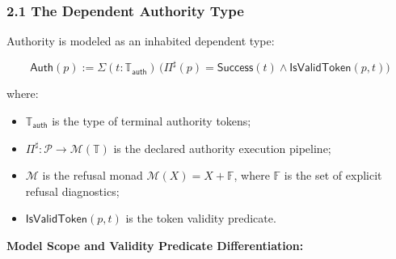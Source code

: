 \documentclass[
  10pt,
]{article}
\begin{document}
\subsubsection{2.1 The Dependent Authority Type}\label{the-dependent-authority-type}

Authority is modeled as an inhabited dependent type:

\hypertarget{math-E0004-0004}{}{\[\mathsf{Auth}(p) := \Sigma(t : \mathbb{T}_{\mathsf{auth}})\,\big(\Pi^\sharp(p) = \mathsf{Success}(t) \wedge \mathsf{IsValidToken}(p, t)\big)\]}

where:

\begin{itemize}
\item
  \hypertarget{math-E0005-0005}{}{\(\mathbb{T}_{\mathsf{auth}}\)} is the type of terminal authority tokens;
\item
  \hypertarget{math-E0006-0006}{}{\(\Pi^\sharp : \mathcal{P} \to \mathcal{M}(\mathbb{T})\)} is the declared authority execution pipeline;
\item
  \hypertarget{math-E0007-0007}{}{\(\mathcal{M}\)} is the refusal monad \hypertarget{math-E0008-0008}{}{\(\mathcal{M}(X) = X + \mathbb{F}\)}, where \hypertarget{math-E0009-0009}{}{\(\mathbb{F}\)} is the set of explicit refusal diagnostics;
\item
  \hypertarget{math-E0010-0010}{}{\(\mathsf{IsValidToken}(p, t)\)} is the token validity predicate.
\end{itemize}

\textbf{Model Scope and Validity Predicate Differentiation:}
\end{document}
